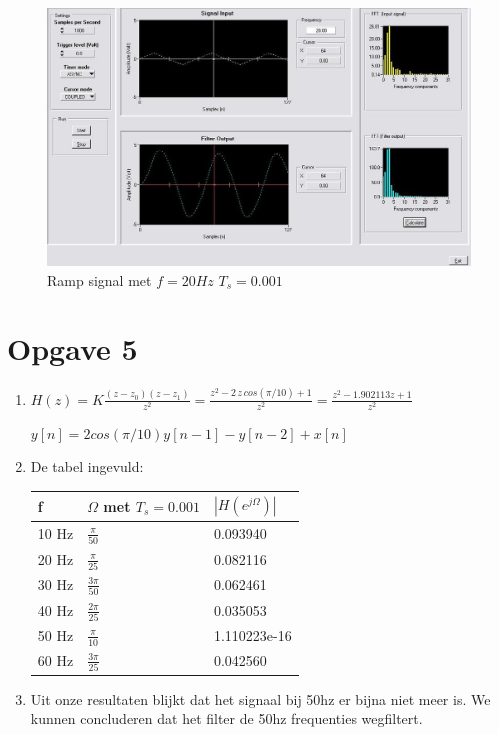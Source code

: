 \documentclass[10pt,a4paper]{article}
\begin{document}
    \begin{figure}[H]
    \includegraphics[scale=0.5]{ramp_filter_1000_20.JPG}
    \caption{Ramp signal met $f=20Hz$ $T_{s}=0.001$}
    \end{figure}
 

\section*{Opgave 5} %
\label{sec:Opgave 5}

\begin{enumerate}
    \item $ H(z) = K \frac{(z - z_0)(z - z_1)}{z^2}
               = \frac{z^2 - 2\, z \, cos(\pi/10) + 1}{z^2} = \frac{z^2 -
               1.902113z + 1}{z^2} $

    \noindent $ y[n] = 2cos(\pi/10)y[n-1] - y[n-2] + x[n] $

    \item De tabel ingevuld:
    \begin{table}[H] \centering
    \begin{tabular}{|l|l|l|} \hline
    f & $\Omega$ met $T_s = 0.001$ & $|H(e^{j\Omega})|$ \\ \hline
    10 Hz & $ \frac{\pi}{50}$  & 0.093940     \\ \hline
    20 Hz & $ \frac{\pi}{25}$  & 0.082116     \\ \hline
    30 Hz & $ \frac{3\pi}{50}$ & 0.062461     \\ \hline
    40 Hz & $ \frac{2\pi}{25}$ & 0.035053     \\ \hline
    50 Hz & $ \frac{\pi}{10}$  & 1.110223e-16 \\ \hline
    60 Hz & $ \frac{3\pi}{25}$ & 0.042560     \\ \hline
    \end{tabular}
    \end{table}

\item Uit onze resultaten blijkt dat het signaal bij 50hz er bijna niet meer is. We kunnen concluderen dat het filter de 50hz frequenties wegfiltert.

\end{enumerate}

\end{document}
